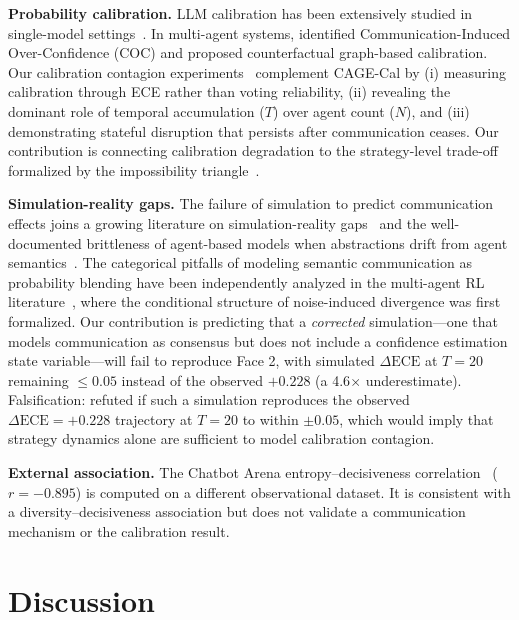 \documentclass[11pt]{article}
\begin{document}
\textbf{Probability calibration.} LLM calibration has been extensively studied in single-model settings~\cite{guo2017calibration,jiang2021can}. In multi-agent systems, \citet{huang2026cagecal} identified Communication-Induced Over-Confidence (COC) and proposed counterfactual graph-based calibration. Our calibration contagion experiments~\cite{liu2026calibration} complement CAGE-Cal by (i) measuring calibration through ECE rather than voting reliability, (ii) revealing the dominant role of temporal accumulation ($T$) over agent count ($N$), and (iii) demonstrating stateful disruption that persists after communication ceases. Our contribution is connecting calibration degradation to the strategy-level trade-off formalized by the impossibility triangle~\cite{liu2026impossible}.

\textbf{Simulation-reality gaps.} The failure of simulation to predict communication effects joins a growing literature on simulation-reality gaps~\cite{richter2024bridging} and the well-documented brittleness of agent-based models when abstractions drift from agent semantics~\cite{foerster2018emergent}. The categorical pitfalls of modeling semantic communication as probability blending have been independently analyzed in the multi-agent RL literature~\cite{foerster2016learning,kapetanakis2014balanced}, where the conditional structure of noise-induced divergence was first formalized. Our contribution is predicting that a \textit{corrected} simulation---one that models communication as consensus but does not include a confidence estimation state variable---will fail to reproduce Face 2, with simulated $\Delta\text{ECE}$ at $T = 20$ remaining $\leq 0.05$ instead of the observed $+0.228$ (a 4.6$\times$ underestimate). Falsification: refuted if such a simulation reproduces the observed $\Delta\text{ECE} = +0.228$ trajectory at $T = 20$ to within $\pm 0.05$, which would imply that strategy dynamics alone are sufficient to model calibration contagion.

\textbf{External association.} The Chatbot Arena entropy--decisiveness correlation~\cite{zheng2023chatbot,chiang2024chatbot} ($r=-0.895$) is computed on a different observational dataset. It is consistent with a diversity--decisiveness association but does not validate a communication mechanism or the calibration result.

\section{Discussion}
\end{document}
